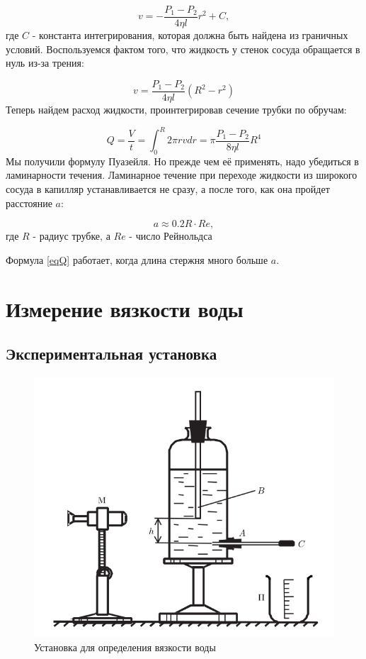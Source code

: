 \documentclass[a4paper]{article}
\begin{document}
\begin{equation} \label{eqv}
    v = - \frac{P_1 - P_2}{4 \eta l}r^2 + C,
\end{equation}
где $C$ - константа интегрирования, которая должна быть найдена из граничных условий.
Воспользуемся фактом того, что жидкость у стенок сосуда обращается в нуль из-за трения:

\begin{equation}
    v = \frac{P_1 - P_2}{4\eta l}(R^2 - r^2)
\end{equation}
Теперь найдем расход жидкости, проинтегрировав сечение трубки по обручам:

\begin{equation} \label{eqQ}    
    Q = \frac{V}{t} = \int^R_0 2\pi r v dr = \pi \frac{P_1 - P_2}{8 \eta l} R^4
\end{equation}
Мы получили формулу Пуазейля. Но прежде чем её применять,
надо убедиться в ламинарности течения.
Ламинарное течение при переходе жидкости из широкого сосуда в капилляр
устанавливается не сразу, а после того, как она пройдет расстояние $a$:

\begin{equation} \label{eqa}
    a \approx 0.2R\cdot Re,
\end{equation}
где $R$ - радиус трубке, а $Re$ - число Рейнольдса

Формула \eqref{eqQ} работает, когда длина стержня много больше $a$.

\section{Измерение вязкости воды}

\subsection{Экспериментальная установка}

\begin{figure}[h]
    \centering
    \includegraphics[scale=0.55]{A.png}
    \caption{Установка для определения вязкости воды}
\end{figure}
\end{document}
